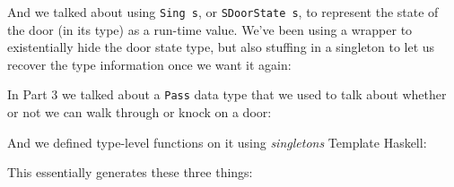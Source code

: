 \documentclass[]{article}
\newenvironment{Shaded}{}{}
\newcommand{\DataTypeTok}[1]{\textcolor[rgb]{0.56,0.13,0.00}{#1}}
\newcommand{\KeywordTok}[1]{\textcolor[rgb]{0.00,0.44,0.13}{\textbf{#1}}}
\newcommand{\NormalTok}[1]{#1}
\newcommand{\OperatorTok}[1]{\textcolor[rgb]{0.40,0.40,0.40}{#1}}
\newcommand{\OtherTok}[1]{\textcolor[rgb]{0.00,0.44,0.13}{#1}}
\begin{document}
And we talked about using \texttt{Sing\ s}, or \texttt{SDoorState\ s}, to
represent the state of the door (in its type) as a run-time value. We've been
using a wrapper to existentially hide the door state type, but also stuffing in
a singleton to let us recover the type information once we want it again:

\begin{Shaded}
\end{Shaded}

In Part 3 we talked about a \texttt{Pass} data type that we used to talk about
whether or not we can walk through or knock on a door:

\begin{Shaded}
\end{Shaded}

And we defined type-level functions on it using \emph{singletons} Template
Haskell:

\begin{Shaded}
\end{Shaded}

This essentially generates these three things:
\end{document}
